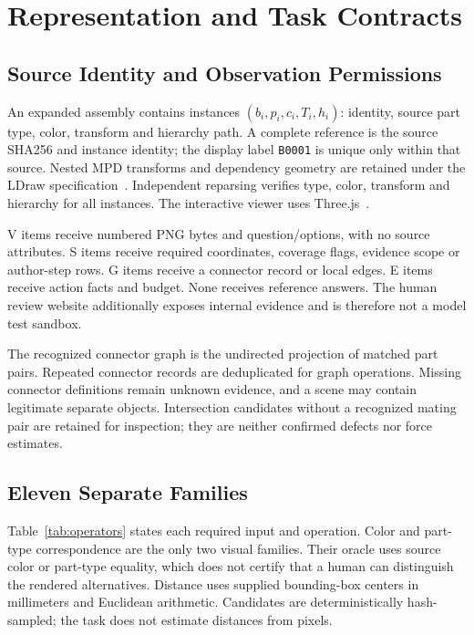 \documentclass[10pt,twocolumn,letterpaper]{article}
\begin{document}
\section{Representation and Task Contracts}\label{sec:contracts}
\subsection{Source Identity and Observation Permissions}
An expanded assembly contains instances $(b_i,p_i,c_i,T_i,h_i)$:
identity, source part type, color, transform and hierarchy path.
A complete reference is the source SHA256 and instance identity;
the display label \texttt{B0001} is unique only within that source.
Nested MPD transforms and dependency geometry are retained under the
LDraw specification~\cite{ldraw}. Independent reparsing verifies type,
color, transform and hierarchy for all \VTwoParts{} instances.
The interactive viewer uses Three.js~\cite{threejs}.

V items receive numbered PNG bytes and question/options, with no
source attributes. S items receive required coordinates, coverage
flags, evidence scope or author-step rows. G items receive a connector
record or local edges. E items receive action facts and budget.
None receives reference answers. The human review website additionally
exposes internal evidence and is therefore not a model test sandbox.

The recognized connector graph is the undirected projection of
matched part pairs. Repeated connector records are deduplicated for
graph operations. Missing connector definitions remain unknown
evidence, and a scene may contain legitimate separate objects.
Intersection candidates without a recognized mating pair are retained
for inspection; they are neither confirmed defects nor force estimates.

\begin{table}[t]
\centering\footnotesize
\caption{All eleven families and their direct measurement contracts.
A/M/P/GI denote atomic, metacognitive, procedural and graph-internal
organization; they are not calibrated difficulty levels.
$\dagger$: constant semantic response/program;
$\ddagger$: explicit evidence reading or arithmetic.}
\label{tab:operators}

\end{table}

\subsection{Eleven Separate Families}
Table~\ref{tab:operators} states each required input and operation.
Color and part-type correspondence are the only two visual families.
Their oracle uses source color or part-type equality, which does not
certify that a human can distinguish the rendered alternatives.
Distance uses supplied bounding-box centers in millimeters and
Euclidean arithmetic. Candidates are deterministically hash-sampled;
the task does not estimate distances from pixels.
\end{document}
